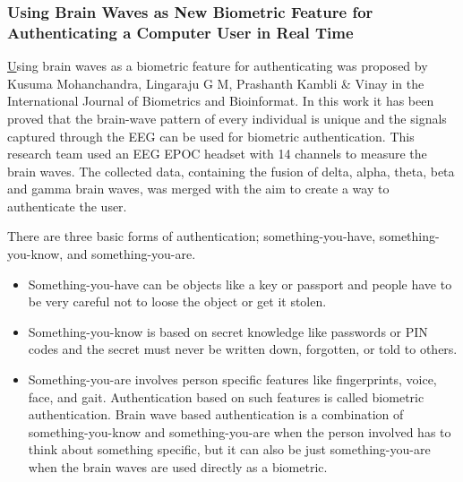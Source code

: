 \subsubsection{Using Brain Waves as New Biometric Feature for Authenticating a Computer User in Real Time}
\href{http://www.cscjournals.org/manuscript/Journals/IJBB/volume7/Issue1/IJBB-211.pdf}
Using brain waves as a biometric feature for authenticating was proposed by Kusuma Mohanchandra, Lingaraju G M, Prashanth Kambli \& Vinay in the International Journal of Biometrics and Bioinformat. In this work it has been proved that the brain-wave pattern of every individual is  unique and the signals captured through the  EEG can be used for biometric authentication. This research team used an EEG EPOC headset with 14 channels to measure the brain waves. The collected data, containing the fusion of delta, alpha, theta, beta and gamma brain waves, was merged with the aim to create a way to authenticate the user.

There are three basic forms of authentication; something-you-have, something-you-know, and something-you-are.
\begin{itemize}
\item Something-you-have can be objects like a key or passport and people have to be very careful not to loose the object or get it stolen.
\item Something-you-know is based on secret knowledge like passwords or PIN codes and the secret must never be written down, forgotten, or told to others.
\item Something-you-are involves person specific features like fingerprints, voice, face, and gait. Authentication based on such features is called biometric authentication. Brain wave based authentication is a combination of something-you-know and something-you-are when the person involved has to think about something specific, but it can also be just something-you-are when the brain waves are used directly as a biometric.
\end{itemize}
 

